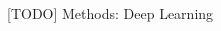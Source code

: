 \documentclass[final,hyperref={pdfpagelabels=false}]{beamer}
\begin{document}
\begin{frame}[t]
\begin{columns}[t]
\begin{column}{.465\textwidth}
\begin{block}{[TODO] Methods: Deep Learning}
\begin{columns}
\begin{column}{.6\textwidth}
\end{column}

\end{columns} %
\end{block}






     


\end{column}
\end{columns}
\end{frame}
\end{document}
